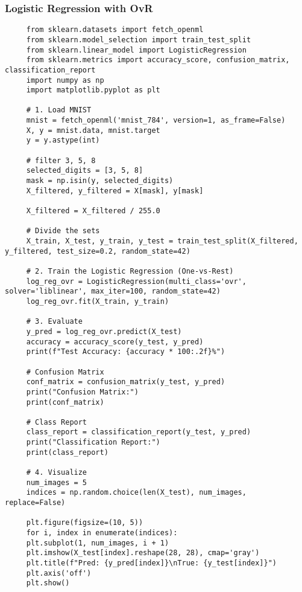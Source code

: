 \documentclass[letterpaper]{article}
\begin{document}
	\subsubsection{Logistic Regression with OvR}
	\begin{lstlisting}
     from sklearn.datasets import fetch_openml
     from sklearn.model_selection import train_test_split
     from sklearn.linear_model import LogisticRegression
     from sklearn.metrics import accuracy_score, confusion_matrix, classification_report
     import numpy as np
     import matplotlib.pyplot as plt
     
     # 1. Load MNIST
     mnist = fetch_openml('mnist_784', version=1, as_frame=False)
     X, y = mnist.data, mnist.target
     y = y.astype(int)
     
     # filter 3, 5, 8
     selected_digits = [3, 5, 8]
     mask = np.isin(y, selected_digits)
     X_filtered, y_filtered = X[mask], y[mask]
     
     X_filtered = X_filtered / 255.0
     
     # Divide the sets
     X_train, X_test, y_train, y_test = train_test_split(X_filtered, y_filtered, test_size=0.2, random_state=42)
     
     # 2. Train the Logistic Regression (One-vs-Rest)
     log_reg_ovr = LogisticRegression(multi_class='ovr', solver='liblinear', max_iter=100, random_state=42)
     log_reg_ovr.fit(X_train, y_train)
     
     # 3. Evaluate
     y_pred = log_reg_ovr.predict(X_test)
     accuracy = accuracy_score(y_test, y_pred)
     print(f"Test Accuracy: {accuracy * 100:.2f}%")
     
     # Confusion Matrix
     conf_matrix = confusion_matrix(y_test, y_pred)
     print("Confusion Matrix:")
     print(conf_matrix)
     
     # Class Report
     class_report = classification_report(y_test, y_pred)
     print("Classification Report:")
     print(class_report)
     
     # 4. Visualize
     num_images = 5
     indices = np.random.choice(len(X_test), num_images, replace=False)
     
     plt.figure(figsize=(10, 5))
     for i, index in enumerate(indices):
     plt.subplot(1, num_images, i + 1)
     plt.imshow(X_test[index].reshape(28, 28), cmap='gray')
     plt.title(f"Pred: {y_pred[index]}\nTrue: {y_test[index]}")
     plt.axis('off')
     plt.show()
     
	\end{lstlisting}
\end{document}
